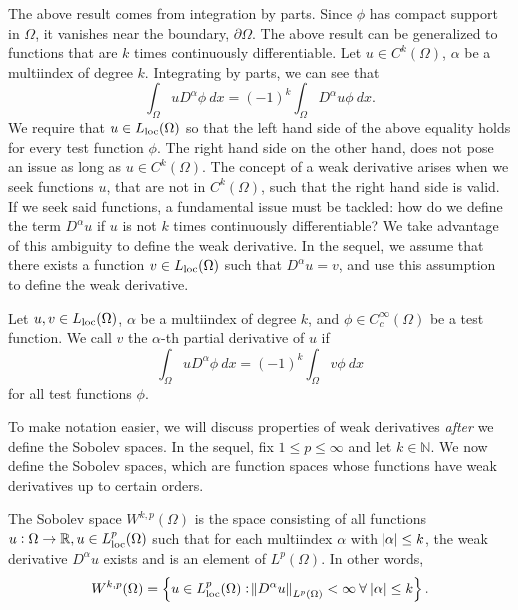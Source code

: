 \documentclass[10pt]{article}
\begin{document}
The above result comes from integration by parts. Since $\phi$ has compact support in $\Omega$, it vanishes near the boundary, $\partial \Omega$. The above result can be generalized to functions that are $k$ times continuously differentiable. Let $u \in C^k(\Omega)$, $\alpha$ be a multiindex of degree $k$. Integrating by parts, we can see that 
\begin{equation}
	\label{definition of weak derivative}
	\displaystyle \int_{\Omega}{uD^\alpha \phi \: dx} = (-1)^k\int_{\Omega}{D^\alpha u \phi \: dx}.
\end{equation}
We require that $u \in L_{\operatorname{loc}}(\Omega)$ so that the left hand side of the above equality holds for every test function $\phi$. The right hand side on the other hand, does not pose an issue as long as $u \in C^k(\Omega)$. The concept of a weak derivative arises when we seek functions $u$, that are not in $C^k(\Omega)$, such that the right hand side is valid. If we seek said functions, a fundamental issue must be tackled: how do we define the term $D^\alpha u$ if $u$ is not $k$ times continuously differentiable? We take advantage of this ambiguity to define the weak derivative. In the sequel, we assume that there exists a function $v \in L_{\operatorname{loc}}(\Omega)$ such that $D^\alpha u = v$, and use this assumption to define the weak derivative. 
\begin{definition}
	Let $u,v \in L_{\operatorname{loc}}(\Omega)$, $\alpha$ be a multiindex of degree $k$, and $\phi \in C_c^{\infty}(\Omega)$ be a test function. We call $v$ the $\alpha$-th partial derivative of $u$ if 
	\begin{equation*}
		\displaystyle \int_{\Omega}{uD^{\alpha} \phi \: dx} = (-1)^k \int_{\Omega}{v \phi \: dx}
	\end{equation*}
	for all test functions $\phi$. 
\end{definition}
To make notation easier, we will discuss properties of weak derivatives \textit{after} we define the Sobolev spaces. In the sequel, fix $1 \leq p \leq \infty$ and let $k \in \mathbb{N}$. We now define the Sobolev spaces, which are function spaces whose functions have weak derivatives up to certain orders. 
\begin{definition}
	The Sobolev space $W^{k,p}(\Omega)$ is the space consisting of all functions $u : \Omega \to \mathbb{R}, u \in L^p_{\operatorname{loc}}(\Omega)$ such that for each multiindex $\alpha$ with $\abs{\alpha} \leq k$, the weak derivative $D^\alpha u$ exists and is an element of $L^p(\Omega)$. In other words, 
	\begin{equation*}
		\displaystyle W^{k,p}(\Omega) = \left\{ u \in L_{\operatorname{loc}}^p(\Omega) : \norm{D^{\alpha}u}_{L^p(\Omega)} < \infty \: \forall \: \abs{\alpha} \leq k \right\}.
	\end{equation*}
\end{definition}
\end{document}
